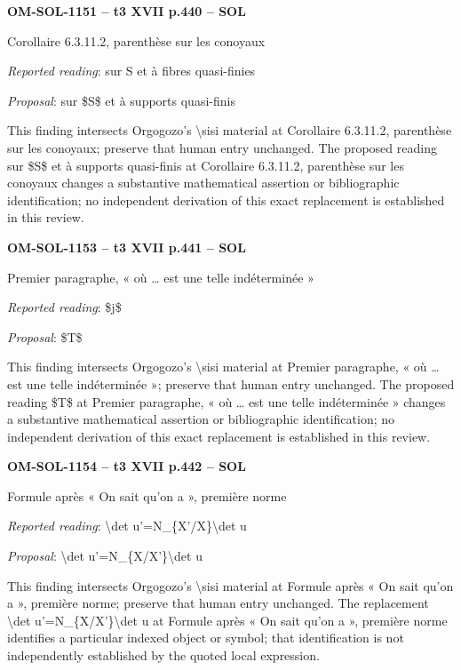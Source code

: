 \par\noindent\textbf{OM-SOL-1151 -- t3 XVII p.440 -- SOL}\par
Corollaire 6.3.11.2, parenthèse sur les conoyaux\par
\emph{Reported reading}: sur S et à fibres quasi-finies\par
\emph{Proposal}: sur \$S\$ et à supports quasi-finis\par
This finding intersects Orgogozo's \textbackslash{}sisi material at Corollaire 6.3.11.2, parenthèse sur les conoyaux; preserve that human entry unchanged. The proposed reading sur \$S\$ et à supports quasi-finis at Corollaire 6.3.11.2, parenthèse sur les conoyaux changes a substantive mathematical assertion or bibliographic identification; no independent derivation of this exact replacement is established in this review.\par
\par\noindent\textbf{OM-SOL-1153 -- t3 XVII p.441 -- SOL}\par
Premier paragraphe, « où … est une telle indéterminée »\par
\emph{Reported reading}: \$j\$\par
\emph{Proposal}: \$T\$\par
This finding intersects Orgogozo's \textbackslash{}sisi material at Premier paragraphe, « où … est une telle indéterminée »; preserve that human entry unchanged. The proposed reading \$T\$ at Premier paragraphe, « où … est une telle indéterminée » changes a substantive mathematical assertion or bibliographic identification; no independent derivation of this exact replacement is established in this review.\par
\par\noindent\textbf{OM-SOL-1154 -- t3 XVII p.442 -- SOL}\par
Formule après « On sait qu'on a », première norme\par
\emph{Reported reading}: \textbackslash{}det u'=\allowbreak N\_\{X'/X\}\textbackslash{}det u\par
\emph{Proposal}: \textbackslash{}det u'=\allowbreak N\_\{X/X'\}\textbackslash{}det u\par
This finding intersects Orgogozo's \textbackslash{}sisi material at Formule après « On sait qu'on a », première norme; preserve that human entry unchanged. The replacement \textbackslash{}det u'=\allowbreak N\_\{X/X'\}\textbackslash{}det u at Formule après « On sait qu'on a », première norme identifies a particular indexed object or symbol; that identification is not independently established by the quoted local expression.\par
